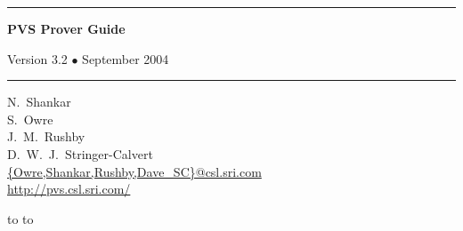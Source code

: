 \documentclass[12pt,twoside]{book}
\begin{document}

\newenvironment{display}{\begin{alltt}\small\tt\vspace{0.3\baselineskip}}{\vspace{0.3\baselineskip}\end{alltt}}
\newcommand{\normtt}[1]{{\obeyspaces \texttt{#1 }}}
\newenvironment{pagegroup}{}{}
\newenvironment{tdisplay}{\begin{alltt}\footnotesize\tt\vspace{0.3\baselineskip}}{\vspace{0.3\baselineskip}\end{alltt}}

%
\newcommand{\Infrule}[3]{
{{\displaystyle\strut #1}\over{\displaystyle\strut #2}}\;\mbox{\scriptsize$\bf #3$}
}
\newcommand{\imp}{\supset}
\newcommand{\pair}[1]{\langle #1 \rangle}
\newcommand{\seq}[2]{#1_{1} \ldots #1_{#2}}  
\newcommand{\implies}{\supset}

\def\id#1{\hbox\texttt{#1}} %
%
%
\vspace{4in}

\begin{titlepage}
\vspace*{1in}
\noindent
\rule[1pt]{\textwidth}{2pt}
\begin{center}
\textbf{\pvstitle PVS Prover Guide}
\end{center}
\begin{flushright}
{\Large Version 3.2 {\smaller$\bullet$} September 2004}
\end{flushright}
\rule[1in]{\textwidth}{2pt}
\vspace*{2in}
\begin{flushleft}
N.~Shankar\\
S.~Owre\\
J.~M.~Rushby\\
D.~W.~J.~Stringer-Calvert\\
{\smaller\url{{Owre,Shankar,Rushby,Dave_SC}@csl.sri.com}}\\
{\smaller\url{http://pvs.csl.sri.com/}}
\end{flushleft}
\vspace*{1in}
\vbox{\hbox to %
\hbox to }
\end{titlepage}
\end{document}
